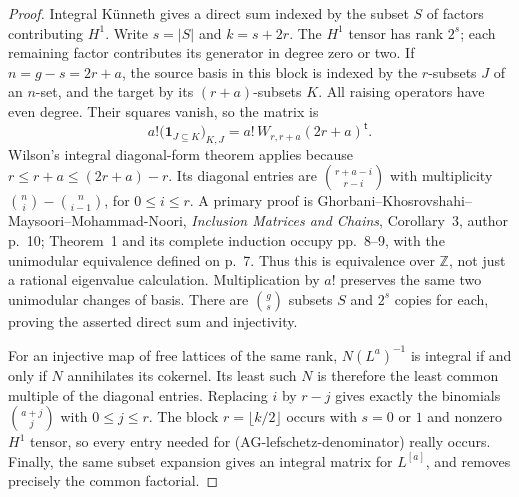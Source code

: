 \begin{proof}
Integral K\"unneth gives a direct sum indexed by the subset $S$
of factors contributing $H^1$.  Write $s=|S|$ and $k=s+2r$.
The $H^1$ tensor has rank $2^s$; each remaining factor contributes
its generator in degree zero or two.  If $n=g-s=2r+a$, the
source basis in this block is indexed by the $r$-subsets $J$
of an $n$-set, and the target by its $(r+a)$-subsets $K$.
All raising operators have even degree.  Their squares vanish,
so the matrix is
\[
 a!\bigl(\mathbf 1_{J\subseteq K}\bigr)_{K,J}
       =a!\,W_{r,r+a}(2r+a)^{\mathsf t}.
\]
Wilson's integral diagonal-form theorem applies because
$r\le r+a\le(2r+a)-r$.  Its diagonal entries are
$\binom{r+a-i}{r-i}$ with multiplicity
$\binom ni-\binom n{i-1}$, for $0\le i\le r$.
A primary proof is Ghorbani--Khosrovshahi--Maysoori--Mohammad-Noori,
\emph{Inclusion Matrices and Chains}, Corollary~3, author p.~10;
Theorem~1 and its complete induction occupy pp.~8--9,
with the unimodular equivalence defined on p.~7.  Thus this
is equivalence over $\mathbb Z$, not just a rational eigenvalue
calculation.  Multiplication by $a!$ preserves the same two
unimodular changes of basis.  There are $\binom gs$ subsets
$S$ and $2^s$ copies for each, proving the asserted direct sum
and injectivity.

For an injective map of free lattices of the same rank,
$N(L^a)^{-1}$ is integral if and only if $N$ annihilates its
cokernel.  Its least such $N$ is therefore the least common
multiple of the diagonal entries.  Replacing $i$ by $r-j$
gives exactly the binomials $\binom{a+j}{j}$ with
$0\le j\le r$.  The block $r=\lfloor k/2\rfloor$ occurs
with $s=0$ or $1$ and nonzero $H^1$ tensor, so every entry
needed for (AG-lefschetz-denominator) really occurs.  Finally,
the same subset expansion gives an integral matrix for
$L^{[a]}$, and removes precisely the common factorial.
\end{proof}

